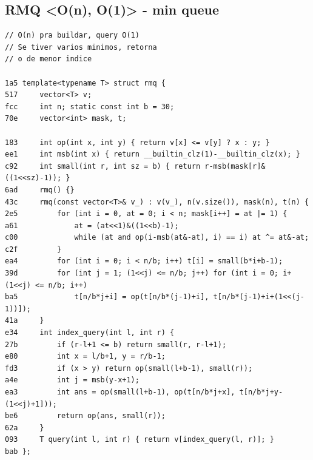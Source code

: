 \documentclass[11pt, a4paper, twoside]{article}
\begin{document}
\subsection{RMQ <O(n), O(1)> - min queue}
\begin{lstlisting}
// O(n) pra buildar, query O(1)
// Se tiver varios minimos, retorna
// o de menor indice

1a5 template<typename T> struct rmq {
517 	vector<T> v;
fcc 	int n; static const int b = 30;
70e 	vector<int> mask, t;
    
183 	int op(int x, int y) { return v[x] <= v[y] ? x : y; }
ee1 	int msb(int x) { return __builtin_clz(1)-__builtin_clz(x); }
c92 	int small(int r, int sz = b) { return r-msb(mask[r]&((1<<sz)-1)); }
6ad 	rmq() {}
43c 	rmq(const vector<T>& v_) : v(v_), n(v.size()), mask(n), t(n) {
2e5 		for (int i = 0, at = 0; i < n; mask[i++] = at |= 1) {
a61 			at = (at<<1)&((1<<b)-1);
c00 			while (at and op(i-msb(at&-at), i) == i) at ^= at&-at;
c2f 		}
ea4 		for (int i = 0; i < n/b; i++) t[i] = small(b*i+b-1);
39d 		for (int j = 1; (1<<j) <= n/b; j++) for (int i = 0; i+(1<<j) <= n/b; i++)
ba5 			t[n/b*j+i] = op(t[n/b*(j-1)+i], t[n/b*(j-1)+i+(1<<(j-1))]);
41a 	}
e34 	int index_query(int l, int r) {
27b 		if (r-l+1 <= b) return small(r, r-l+1);
e80 		int x = l/b+1, y = r/b-1;
fd3 		if (x > y) return op(small(l+b-1), small(r));
a4e 		int j = msb(y-x+1);
ea3 		int ans = op(small(l+b-1), op(t[n/b*j+x], t[n/b*j+y-(1<<j)+1]));
be6 		return op(ans, small(r));
62a 	}
093 	T query(int l, int r) { return v[index_query(l, r)]; }
bab };
\end{lstlisting}
\end{document}
